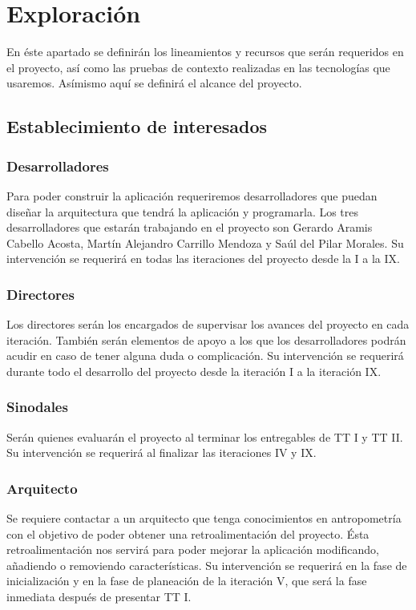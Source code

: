 \section{Exploración}
En éste apartado se definirán los lineamientos y recursos que serán requeridos en el proyecto, así como las pruebas de contexto realizadas en las tecnologías que usaremos. Asímismo aquí se definirá el alcance del proyecto.

\subsection{Establecimiento de interesados}
\subsubsection{Desarrolladores}
Para poder construir la aplicación requeriremos desarrolladores que puedan diseñar la arquitectura que tendrá la aplicación y programarla. Los tres desarrolladores que estarán trabajando en el proyecto son Gerardo Aramis Cabello Acosta, Martín Alejandro Carrillo Mendoza y Saúl del Pilar Morales. Su intervención se requerirá en todas las iteraciones del proyecto desde la I a la IX.
\subsubsection{Directores}
Los directores serán los encargados de supervisar los avances del proyecto en cada iteración. También serán elementos de apoyo a los que los desarrolladores podrán acudir en caso de tener alguna duda o complicación. Su intervención se requerirá durante todo el desarrollo del proyecto desde la iteración I a la iteración IX.
\subsubsection{Sinodales}
Serán quienes evaluarán el proyecto al terminar los entregables de TT I y TT II. Su intervención se requerirá al finalizar las iteraciones IV y IX.
\subsubsection{Arquitecto}
Se requiere contactar a un arquitecto que tenga conocimientos en antropometría con el objetivo de poder obtener una retroalimentación del proyecto. Ésta retroalimentación nos servirá para poder mejorar la aplicación modificando, añadiendo o removiendo características. Su intervención se requerirá en la fase de inicialización y en la fase de planeación de la iteración V, que será la fase inmediata después de presentar TT I.
